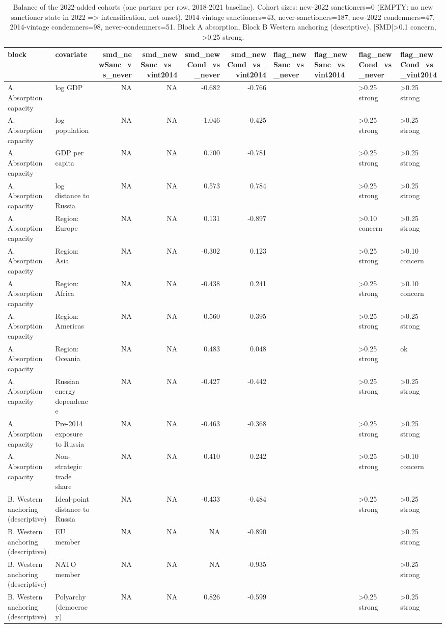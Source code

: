 \begin{table}

\caption{Balance of the 2022-added cohorts (one partner per row, 2018-2021 baseline). Cohort sizes: new-2022 sanctioners=0 (EMPTY: no new sanctioner state in 2022 => intensification, not onset), 2014-vintage sanctioners=43, never-sanctioners=187, new-2022 condemners=47, 2014-vintage condemners=98, never-condemners=51. Block A absorption, Block B Western anchoring (descriptive). |SMD|>0.1 concern, >0.25 strong.}
\centering
\begin{tabular}[t]{llrrrrllll}
\toprule
block & covariate & smd\_newSanc\_vs\_never & smd\_newSanc\_vs\_vint2014 & smd\_newCond\_vs\_never & smd\_newCond\_vs\_vint2014 & flag\_newSanc\_vs\_never & flag\_newSanc\_vs\_vint2014 & flag\_newCond\_vs\_never & flag\_newCond\_vs\_vint2014\\
\midrule
A. Absorption capacity & log GDP & NA & NA & -0.682 & -0.766 &  &  & >0.25 strong & >0.25 strong\\
A. Absorption capacity & log population & NA & NA & -1.046 & -0.425 &  &  & >0.25 strong & >0.25 strong\\
A. Absorption capacity & GDP per capita & NA & NA & 0.700 & -0.781 &  &  & >0.25 strong & >0.25 strong\\
A. Absorption capacity & log distance to Russia & NA & NA & 0.573 & 0.784 &  &  & >0.25 strong & >0.25 strong\\
A. Absorption capacity & Region: Europe & NA & NA & 0.131 & -0.897 &  &  & >0.10 concern & >0.25 strong\\
A. Absorption capacity & Region: Asia & NA & NA & -0.302 & 0.123 &  &  & >0.25 strong & >0.10 concern\\
A. Absorption capacity & Region: Africa & NA & NA & -0.438 & 0.241 &  &  & >0.25 strong & >0.10 concern\\
A. Absorption capacity & Region: Americas & NA & NA & 0.560 & 0.395 &  &  & >0.25 strong & >0.25 strong\\
A. Absorption capacity & Region: Oceania & NA & NA & 0.483 & 0.048 &  &  & >0.25 strong & ok\\
A. Absorption capacity & Russian energy dependence & NA & NA & -0.427 & -0.442 &  &  & >0.25 strong & >0.25 strong\\
A. Absorption capacity & Pre-2014 exposure to Russia & NA & NA & -0.463 & -0.368 &  &  & >0.25 strong & >0.25 strong\\
A. Absorption capacity & Non-strategic trade share & NA & NA & 0.410 & 0.242 &  &  & >0.25 strong & >0.10 concern\\
B. Western anchoring (descriptive) & Ideal-point distance to Russia & NA & NA & -0.433 & -0.484 &  &  & >0.25 strong & >0.25 strong\\
B. Western anchoring (descriptive) & EU member & NA & NA & NA & -0.890 &  &  &  & >0.25 strong\\
B. Western anchoring (descriptive) & NATO member & NA & NA & NA & -0.935 &  &  &  & >0.25 strong\\
B. Western anchoring (descriptive) & Polyarchy (democracy) & NA & NA & 0.826 & -0.599 &  &  & >0.25 strong & >0.25 strong\\
\bottomrule
\end{tabular}
\end{table}
